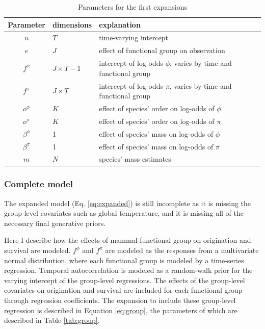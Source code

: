 \documentclass[12pt,letterpaper]{article}
\begin{document}
\begin{table}
  \centering
  \caption{Parameters for the first expansions}
  \begin{tabular}{c l l}
    Parameter & dimensions & explanation \\
    \hline
    \(u\) & \(T\) & time-varying intercept \\
    \(e\) & \(J\) & effect of functional group on observation \\
    \(f^{\phi}\) & \(J \times T - 1\) & intercept of log-odds \(\phi\), varies by time and functional group\\
    \(f^{\pi}\) & \(J \times T\) & intercept of log-odds \(\pi\), varies by time and functional group \\
    \(o^{\phi}\) & \(K\) & effect of species' order on log-odds of \(\phi\) \\
    \(o^{\pi}\) & \(K\) & effect of species' order on log-odds of \(\pi\) \\
    \(\beta^{\phi}\) & 1 & effect of species' mass on log-odds of \(\phi\) \\
    \(\beta^{\pi}\) & 1 & effect of species' mass on log-odds of \(\pi\) \\
    \(m\) & \(N\) & species' mass estimates \\
  \end{tabular}
  \label{tab:expanded}
\end{table}


\subsubsection*{Complete model}
The expanded model (Eq. \ref{eq:expanded}) is still incomplete as it is missing the group-level covariates such as global temperature, and it is missing all of the necessary final generative priors. 

Here I describe how the effects of mammal functional group on origination and survival are modeled. \(f^{\phi}\) and \(f^{\pi}\) are modeled as the responses from a multivariate normal distribution, where each functional group is modeled by a time-series regression. Temporal autocorrelation is modeled as a random-walk prior for the varying intercept of the group-level regressions. The effects of the group-level covariates on origination and survival are included for each functional group through regression coefficients. The expansion to include these group-level regression is described in Equation \ref{eq:group}, the parameters of which are described in Table \ref{tab:group}. 
\end{document}
